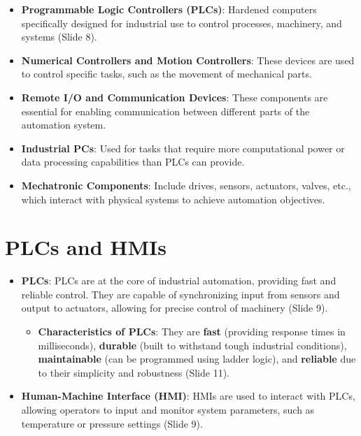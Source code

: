 \documentclass[
  14pt,
  a4paper,
  numbers=noendperiod,
  headinclude=true,
  footinclude=true,
  DIV=calc]{scrreprt}
\providecommand{\tightlist}{%
  \setlength{\itemsep}{0pt}\setlength{\parskip}{0pt}}\usepackage{longtable,booktabs,array}
\begin{document}
\begin{itemize}
\tightlist
\item
  \textbf{Programmable Logic Controllers (PLCs)}: Hardened computers
  specifically designed for industrial use to control processes,
  machinery, and systems (Slide 8).
\item
  \textbf{Numerical Controllers and Motion Controllers}: These devices
  are used to control specific tasks, such as the movement of mechanical
  parts.
\item
  \textbf{Remote I/O and Communication Devices}: These components are
  essential for enabling communication between different parts of the
  automation system.
\item
  \textbf{Industrial PCs}: Used for tasks that require more
  computational power or data processing capabilities than PLCs can
  provide.
\item
  \textbf{Mechatronic Components}: Include drives, sensors, actuators,
  valves, etc., which interact with physical systems to achieve
  automation objectives.
\end{itemize}

\section{PLCs and HMIs}\label{plcs-and-hmis}

\begin{itemize}
\tightlist
\item
  \textbf{PLCs}: PLCs are at the core of industrial automation,
  providing fast and reliable control. They are capable of synchronizing
  input from sensors and output to actuators, allowing for precise
  control of machinery (Slide 9).

  \begin{itemize}
  \tightlist
  \item
    \textbf{Characteristics of PLCs}: They are \textbf{fast} (providing
    response times in milliseconds), \textbf{durable} (built to
    withstand tough industrial conditions), \textbf{maintainable} (can
    be programmed using ladder logic), and \textbf{reliable} due to
    their simplicity and robustness (Slide 11).
  \end{itemize}
\item
  \textbf{Human-Machine Interface (HMI)}: HMIs are used to interact with
  PLCs, allowing operators to input and monitor system parameters, such
  as temperature or pressure settings (Slide 9).
\end{itemize}
\end{document}

